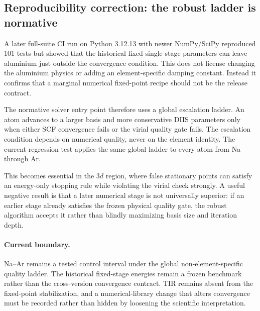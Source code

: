 \subsection{Reproducibility correction: the robust ladder is normative}
A later full-suite CI run on Python 3.12.13 with newer NumPy/SciPy reproduced 101 tests but showed that the historical fixed single-stage parameters can leave aluminium just outside the convergence condition.  This does not license changing the aluminium physics or adding an element-specific damping constant.  Instead it confirms that a marginal numerical fixed-point recipe should not be the release contract.

The normative solver entry point therefore uses a global escalation ladder.  An atom advances to a larger basis and more conservative DIIS parameters only when either SCF convergence fails or the virial quality gate fails.  The escalation condition depends on numerical quality, never on the element identity.  The current regression test applies the same global ladder to every atom from Na through Ar.

This becomes essential in the $3d$ region, where false stationary points can satisfy an energy-only stopping rule while violating the virial check strongly.  A useful negative result is that a later numerical stage is not universally superior: if an earlier stage already satisfies the frozen physical quality gate, the robust algorithm accepts it rather than blindly maximizing basis size and iteration depth.

\paragraph{Current boundary.}
Na--Ar remains a tested control interval under the global non-element-specific quality ladder.  The historical fixed-stage energies remain a frozen benchmark rather than the cross-version convergence contract.  TIR remains absent from the fixed-point stabilization, and a numerical-library change that alters convergence must be recorded rather than hidden by loosening the scientific interpretation.
